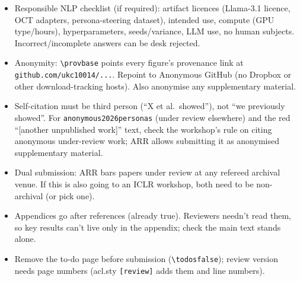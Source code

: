 \documentclass{article}
\begin{document}
\begin{itemize}
  \item Responsible NLP checklist (if required): artifact licences (Llama-3.1 licence, OCT adapters, persona-steering dataset), intended use, compute (GPU type/hours), hyperparameters, seeds/variance, LLM use, no human subjects. Incorrect/incomplete answers can be desk rejected.
  \item Anonymity: \texttt{\textbackslash provbase} points every figure's provenance link at \texttt{github.com/ukc10014/...}. Repoint to Anonymous GitHub (no Dropbox or other download-tracking hosts). Also anonymise any supplementary material.
  \item Self-citation must be third person (``X et al.\ showed''), not ``we previously showed''. For \texttt{anonymous2026personas} (under review elsewhere) and the red ``[another unpublished work]'' text, check the workshop's rule on citing anonymous under-review work; ARR allows submitting it as anonymised supplementary material.
  \item Dual submission: ARR bars papers under review at any refereed archival venue. If this is also going to an ICLR workshop, both need to be non-archival (or pick one).
  \item Appendices go after references (already true). Reviewers needn't read them, so key results can't live only in the appendix; check the main text stands alone.
  \item Remove the to-do page before submission (\texttt{\textbackslash todosfalse}); review version needs page numbers (acl.sty \texttt{[review]} adds them and line numbers).
\end{itemize}
\end{document}
